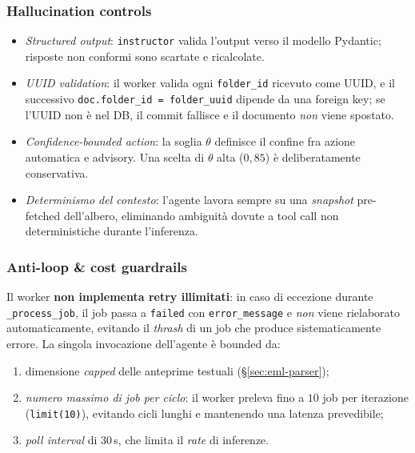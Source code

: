 \documentclass[11pt,a4paper,oneside]{article}
\begin{document}
\subsubsection{Hallucination controls}
\begin{itemize}[leftmargin=*]
    \item \emph{Structured output}: \texttt{instructor} valida l'output verso
          il modello Pydantic; risposte non conformi sono scartate e ricalcolate.
    \item \emph{UUID validation}: il worker valida ogni \texttt{folder\_id}
          ricevuto come UUID, e il successivo \texttt{doc.folder\_id =
          folder\_uuid} dipende da una foreign key; se l'UUID non \`e nel
          DB, il commit fallisce e il documento \emph{non} viene spostato.
    \item \emph{Confidence-bounded action}: la soglia $\theta$ definisce il
          confine fra azione automatica e advisory. Una scelta di $\theta$
          alta ($0{,}85$) \`e deliberatamente conservativa.
    \item \emph{Determinismo del contesto}: l'agente lavora sempre su una
          \emph{snapshot} pre-fetched dell'albero, eliminando ambiguit\`a
          dovute a tool call non deterministiche durante l'inferenza.
\end{itemize}

\subsubsection{Anti-loop \& cost guardrails}
Il worker \textbf{non implementa retry illimitati}: in caso di eccezione
durante \texttt{\_process\_job}, il job passa a \texttt{failed} con
\texttt{error\_message} e \emph{non} viene rielaborato automaticamente, evitando
il \emph{thrash} di un job che produce sistematicamente errore.
La singola invocazione dell'agente \`e bounded da:
\begin{enumerate}[leftmargin=*]
    \item dimensione \emph{capped} delle anteprime testuali
          (\S\ref{sec:eml-parser});
    \item \emph{numero massimo di job per ciclo}: il worker preleva fino a
          $10$ job per iterazione (\texttt{limit(10)}), evitando cicli lunghi
          e mantenendo una latenza prevedibile;
    \item \emph{poll interval} di $30$\,s, che limita il \emph{rate} di
          inferenze.
\end{enumerate}
\end{document}
